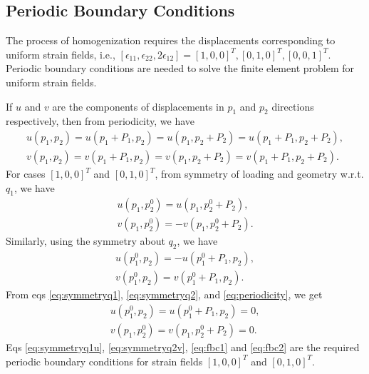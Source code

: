 \documentclass[10pt]{article}
\begin{document}
\subsection{Periodic Boundary Conditions}
The process of homogenization requires the displacements corresponding to uniform strain fields, i.e., $[\epsilon_{11}, \epsilon_{22}, 2\epsilon_{12}] = [1, 0, 0]^T, [0, 1, 0]^T, [0, 0, 1]^T$. Periodic boundary conditions are needed to solve the finite element problem for uniform strain fields.\par
If $u$ and $v$ are the components of displacements in $p_1$ and $p_2$ directions respectively, then from periodicity, we have
\begin{equation}
\label{eq:periodicity}
\begin{split}
u(p_1, p_2) = u(p_1+P_1, p_2) = u(p_1, p_2+P_2) = u(p_1+P_1, p_2+P_2),\\
v(p_1, p_2) = v(p_1+P_1, p_2) = v(p_1, p_2+P_2) = v(p_1+P_1, p_2+P_2).
\end{split}
\end{equation}
For cases $[1, 0, 0]^T$ and $[0, 1, 0]^T$, from symmetry of loading and geometry w.r.t. $q_1$, we have
\begin{eqnarray}
\label{eq:symmetryq1u}
u(p_1, p_2^0) = u(p_1, p_2^0+P_2),\\
\label{eq:symmetryq1}
v(p_1, p_2^0) = -v(p_1, p_2^0+P_2).
\end{eqnarray}
Similarly, using the symmetry about $q_2$, we have
\begin{eqnarray}
\label{eq:symmetryq2}
u(p_1^0, p_2) = -u(p_1^0+P_1, p_2),\\
\label{eq:symmetryq2v}
v(p_1^0, p_2) = v(p_1^0+P_1, p_2).
\end{eqnarray}
From eqs \eqref{eq:symmetryq1}, \eqref{eq:symmetryq2}, and \eqref{eq:periodicity}, we get
\begin{eqnarray}
\label{eq:fbc1}
u(p_1^0, p_2) = u(p_1^0+P_1, p_2) = 0,\\
\label{eq:fbc2}
v(p_1, p_2^0) = v(p_1, p_2^0+P_2) = 0.
\end{eqnarray}
Eqs \eqref{eq:symmetryq1u}, \eqref{eq:symmetryq2v}, \eqref{eq:fbc1} and 
\eqref{eq:fbc2} are the required periodic boundary conditions for strain fields $[1, 0, 0]^T$ and $[0, 1, 0]^T$.
\end{document}
